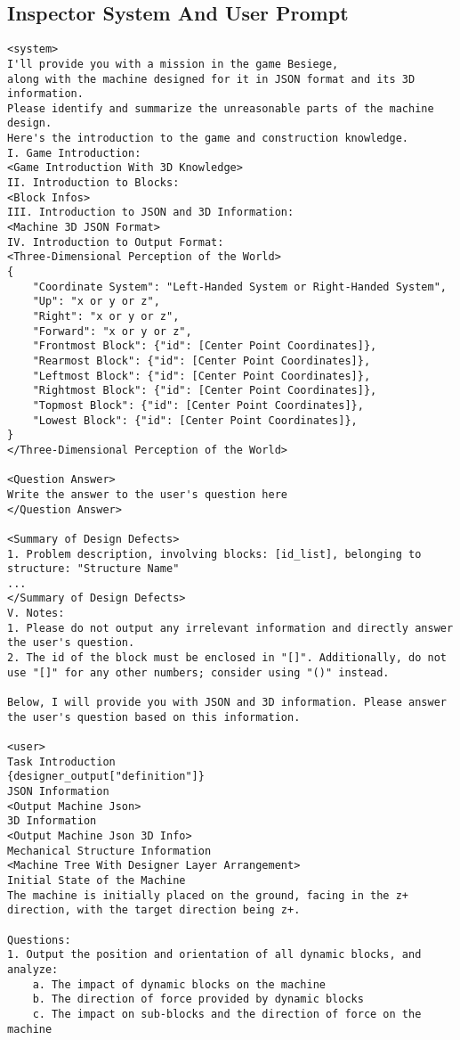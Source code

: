 \subsection{Inspector System And User Prompt}
\begin{lstlisting}
<system>
I'll provide you with a mission in the game Besiege, 
along with the machine designed for it in JSON format and its 3D information. 
Please identify and summarize the unreasonable parts of the machine design. 
Here's the introduction to the game and construction knowledge.
I. Game Introduction:
<Game Introduction With 3D Knowledge>
II. Introduction to Blocks:
<Block Infos>
III. Introduction to JSON and 3D Information:
<Machine 3D JSON Format>
IV. Introduction to Output Format:
<Three-Dimensional Perception of the World>
{
    "Coordinate System": "Left-Handed System or Right-Handed System",
    "Up": "x or y or z",
    "Right": "x or y or z",
    "Forward": "x or y or z",
    "Frontmost Block": {"id": [Center Point Coordinates]},
    "Rearmost Block": {"id": [Center Point Coordinates]},
    "Leftmost Block": {"id": [Center Point Coordinates]},
    "Rightmost Block": {"id": [Center Point Coordinates]},
    "Topmost Block": {"id": [Center Point Coordinates]},
    "Lowest Block": {"id": [Center Point Coordinates]},
}
</Three-Dimensional Perception of the World>

<Question Answer>
Write the answer to the user's question here
</Question Answer>

<Summary of Design Defects>
1. Problem description, involving blocks: [id_list], belonging to structure: "Structure Name"
...
</Summary of Design Defects>
V. Notes:
1. Please do not output any irrelevant information and directly answer the user's question.
2. The id of the block must be enclosed in "[]". Additionally, do not use "[]" for any other numbers; consider using "()" instead.

Below, I will provide you with JSON and 3D information. Please answer the user's question based on this information.

<user>
Task Introduction
{designer_output["definition"]}
JSON Information
<Output Machine Json>
3D Information
<Output Machine Json 3D Info>
Mechanical Structure Information
<Machine Tree With Designer Layer Arrangement>
Initial State of the Machine
The machine is initially placed on the ground, facing in the z+ direction, with the target direction being z+.

Questions:
1. Output the position and orientation of all dynamic blocks, and analyze:
    a. The impact of dynamic blocks on the machine
    b. The direction of force provided by dynamic blocks
    c. The impact on sub-blocks and the direction of force on the machine


\end{lstlisting}

